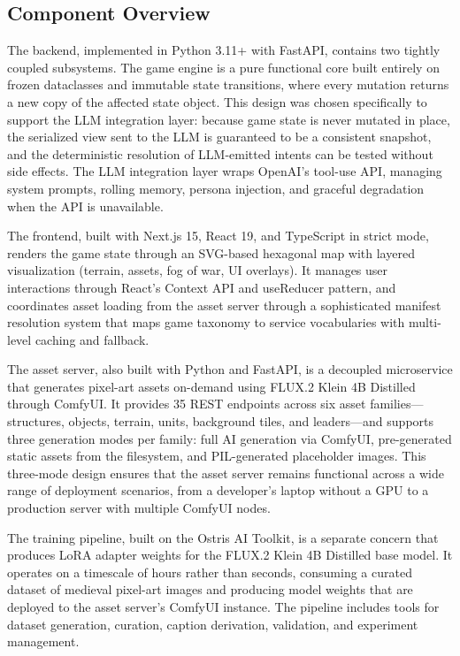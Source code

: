 \documentclass[conference]{IEEEtran}
\begin{document}
\subsection{Component Overview}

The backend, implemented in Python 3.11+ with FastAPI, contains two tightly coupled subsystems. The game engine is a pure functional core built entirely on frozen dataclasses and immutable state transitions, where every mutation returns a new copy of the affected state object. This design was chosen specifically to support the LLM integration layer: because game state is never mutated in place, the serialized view sent to the LLM is guaranteed to be a consistent snapshot, and the deterministic resolution of LLM-emitted intents can be tested without side effects. The LLM integration layer wraps OpenAI's tool-use API, managing system prompts, rolling memory, persona injection, and graceful degradation when the API is unavailable.

The frontend, built with Next.js 15, React 19, and TypeScript in strict mode, renders the game state through an SVG-based hexagonal map with layered visualization (terrain, assets, fog of war, UI overlays). It manages user interactions through React's Context API and useReducer pattern, and coordinates asset loading from the asset server through a sophisticated manifest resolution system that maps game taxonomy to service vocabularies with multi-level caching and fallback.

The asset server, also built with Python and FastAPI, is a decoupled microservice that generates pixel-art assets on-demand using FLUX.2 Klein 4B Distilled through ComfyUI. It provides 35 REST endpoints across six asset families---structures, objects, terrain, units, background tiles, and leaders---and supports three generation modes per family: full AI generation via ComfyUI, pre-generated static assets from the filesystem, and PIL-generated placeholder images. This three-mode design ensures that the asset server remains functional across a wide range of deployment scenarios, from a developer's laptop without a GPU to a production server with multiple ComfyUI nodes.

The training pipeline, built on the Ostris AI Toolkit, is a separate concern that produces LoRA adapter weights for the FLUX.2 Klein 4B Distilled base model. It operates on a timescale of hours rather than seconds, consuming a curated dataset of medieval pixel-art images and producing model weights that are deployed to the asset server's ComfyUI instance. The pipeline includes tools for dataset generation, curation, caption derivation, validation, and experiment management.
\end{document}
